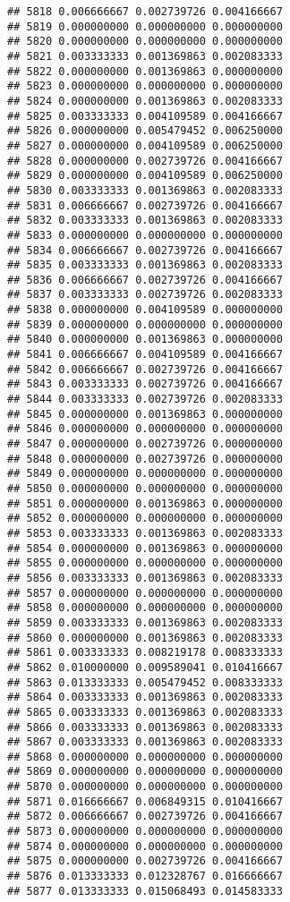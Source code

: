 \documentclass[
]{article}
\begin{document}
\begin{verbatim}
## 5818 0.006666667 0.002739726 0.004166667
## 5819 0.000000000 0.000000000 0.000000000
## 5820 0.000000000 0.000000000 0.000000000
## 5821 0.003333333 0.001369863 0.002083333
## 5822 0.000000000 0.001369863 0.000000000
## 5823 0.000000000 0.000000000 0.000000000
## 5824 0.000000000 0.001369863 0.002083333
## 5825 0.003333333 0.004109589 0.004166667
## 5826 0.000000000 0.005479452 0.006250000
## 5827 0.000000000 0.004109589 0.006250000
## 5828 0.000000000 0.002739726 0.004166667
## 5829 0.000000000 0.004109589 0.006250000
## 5830 0.003333333 0.001369863 0.002083333
## 5831 0.006666667 0.002739726 0.004166667
## 5832 0.003333333 0.001369863 0.002083333
## 5833 0.000000000 0.000000000 0.000000000
## 5834 0.006666667 0.002739726 0.004166667
## 5835 0.003333333 0.001369863 0.002083333
## 5836 0.006666667 0.002739726 0.004166667
## 5837 0.003333333 0.002739726 0.002083333
## 5838 0.000000000 0.004109589 0.000000000
## 5839 0.000000000 0.000000000 0.000000000
## 5840 0.000000000 0.001369863 0.000000000
## 5841 0.006666667 0.004109589 0.004166667
## 5842 0.006666667 0.002739726 0.004166667
## 5843 0.003333333 0.002739726 0.004166667
## 5844 0.003333333 0.002739726 0.002083333
## 5845 0.000000000 0.001369863 0.000000000
## 5846 0.000000000 0.000000000 0.000000000
## 5847 0.000000000 0.002739726 0.000000000
## 5848 0.000000000 0.002739726 0.000000000
## 5849 0.000000000 0.000000000 0.000000000
## 5850 0.000000000 0.000000000 0.000000000
## 5851 0.000000000 0.001369863 0.000000000
## 5852 0.000000000 0.000000000 0.000000000
## 5853 0.003333333 0.001369863 0.002083333
## 5854 0.000000000 0.001369863 0.000000000
## 5855 0.000000000 0.000000000 0.000000000
## 5856 0.003333333 0.001369863 0.002083333
## 5857 0.000000000 0.000000000 0.000000000
## 5858 0.000000000 0.000000000 0.000000000
## 5859 0.003333333 0.001369863 0.002083333
## 5860 0.000000000 0.001369863 0.002083333
## 5861 0.003333333 0.008219178 0.008333333
## 5862 0.010000000 0.009589041 0.010416667
## 5863 0.013333333 0.005479452 0.008333333
## 5864 0.003333333 0.001369863 0.002083333
## 5865 0.003333333 0.001369863 0.002083333
## 5866 0.003333333 0.001369863 0.002083333
## 5867 0.003333333 0.001369863 0.002083333
## 5868 0.000000000 0.000000000 0.000000000
## 5869 0.000000000 0.000000000 0.000000000
## 5870 0.000000000 0.000000000 0.000000000
## 5871 0.016666667 0.006849315 0.010416667
## 5872 0.006666667 0.002739726 0.004166667
## 5873 0.000000000 0.000000000 0.000000000
## 5874 0.000000000 0.000000000 0.000000000
## 5875 0.000000000 0.002739726 0.004166667
## 5876 0.013333333 0.012328767 0.016666667
## 5877 0.013333333 0.015068493 0.014583333

\end{verbatim}
\end{document}
